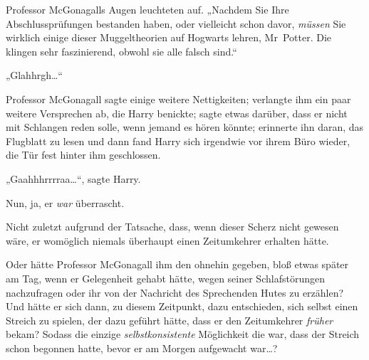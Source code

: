 Professor McGonagalls Augen leuchteten auf. „Nachdem Sie Ihre Abschlussprüfungen bestanden haben, oder vielleicht schon davor, \emph{müssen} Sie wirklich einige dieser Muggeltheorien auf Hogwarts lehren, Mr~Potter. Die klingen sehr faszinierend, obwohl sie alle falsch sind.“

„Glahhrgh…“

Professor McGonagall sagte einige weitere Nettigkeiten; verlangte ihm ein paar weitere Versprechen ab, die Harry benickte; sagte etwas darüber, dass er nicht mit Schlangen reden solle, wenn jemand es hören könnte; erinnerte ihn daran, das Flugblatt zu lesen und dann fand Harry sich irgendwie vor ihrem Büro wieder, die Tür fest hinter ihm geschlossen.

„Gaahhhrrrraa…“, sagte Harry.

Nun, ja, er \emph{war} überrascht.

Nicht zuletzt aufgrund der Tatsache, dass, wenn dieser Scherz nicht gewesen wäre, er womöglich niemals überhaupt einen Zeitumkehrer erhalten hätte.

Oder hätte Professor McGonagall ihm den ohnehin gegeben, bloß etwas später am Tag, wenn er Gelegenheit gehabt hätte, wegen seiner Schlafstörungen nachzufragen oder ihr von der Nachricht des Sprechenden Hutes zu erzählen? Und hätte er sich dann, zu diesem Zeitpunkt, dazu entschieden, sich selbst einen Streich zu spielen, der dazu geführt hätte, dass er den Zeitumkehrer \emph{früher} bekam? Sodass die einzige \emph{selbstkonsistente} Möglichkeit die war, dass der Streich schon begonnen hatte, bevor er am Morgen aufgewacht war…?

